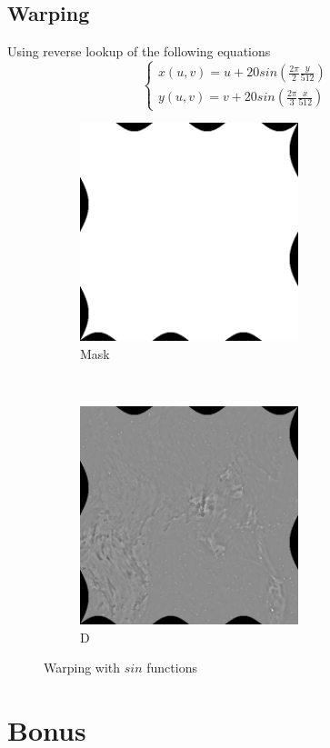 \documentclass[12pt]{article}
\begin{document}
\subsection*{Warping}
Using reverse lookup of the following equations
\begin{equation}
\begin{cases}
	x(u, v) = u + 20 sin(\frac{2 \pi}{2} \frac{y}{512} ) \\
	y(u, v) = v + 20 sin(\frac{2 \pi}{3} \frac{x}{512} )
\end{cases}
\end{equation}

\begin{figure}[H]
    \centering
    \begin{subfigure}[t]{0.5\textwidth}
        \centering
        \includegraphics[height=2.5in]{images/warp_mask}
        \caption{Mask}
    \end{subfigure}%
    ~
    \begin{subfigure}[t]{0.5\textwidth}
        \centering
        \includegraphics[height=2.5in]{images/warp_c}
        \caption{D}
    \end{subfigure}
    \caption{Warping with $sin$ functions}
    \label{fig:warp}
\end{figure}

\section*{Bonus}
\end{document}
